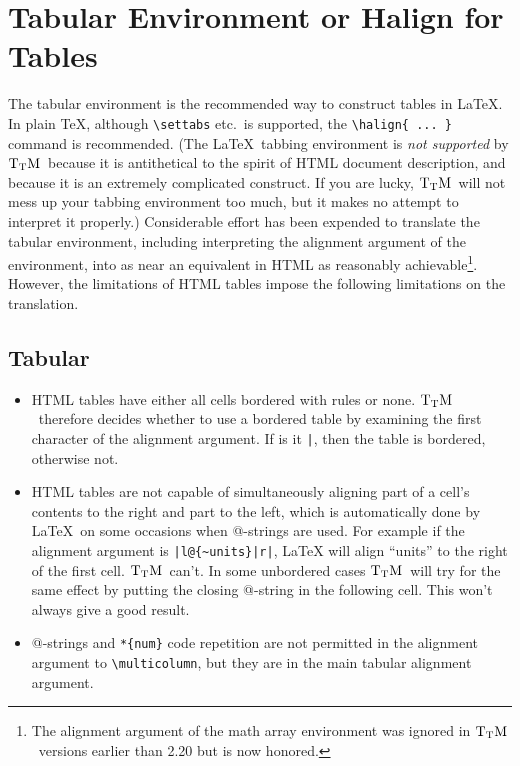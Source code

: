 \documentclass[12pt]{article}
\def\TtM{$\rm{}T_TH$}
\def\TtM{$\rm{}T_TM$}%
\begin{document}
\section{Tabular Environment or Halign for Tables} 
\label{tabhal}
The tabular environment is the recommended way to construct tables in
\LaTeX. In plain \TeX, although \verb|\settabs| etc.~is supported, the
\verb|\halign{ ... }| command is recommended.  (The \LaTeX\ tabbing
environment is \emph{not supported} by \TtM\ because it is antithetical
to the spirit of HTML document description, and because it is an
extremely complicated construct. If you are lucky, \TtM\ will not mess
up your tabbing environment too much, but it makes no attempt to
interpret it properly.) Considerable effort has been expended to
translate the tabular environment, including interpreting the
alignment argument of the environment, into as near an equivalent in
HTML as reasonably achievable\footnote{The alignment argument of the
math array environment was ignored in \TtM\ versions earlier than 2.20
but is now honored.}. However, the limitations of HTML tables impose
the following limitations on the translation.

\subsection{Tabular}
\begin{itemize}

\item HTML tables have either all cells bordered with rules or
none. \TtM\ therefore decides whether to use a bordered table by
examining the first character of the alignment argument. If is it
\verb!|!, then the table is bordered, otherwise not.

\item HTML tables are not capable of simultaneously aligning part of a
cell's contents to the right and part to the left, which is
automatically done by \LaTeX\ on some occasions when @-strings are used.
For example if the alignment argument is \verb!|l@{~units}|r|!, \LaTeX
will align ``units'' to the right of the first cell. \TtM\ can't. In
some unbordered cases \TtM\ will try for the same effect by putting the
closing @-string in the following cell. This won't always give a good
result.

\item @-strings and \verb!*{num}! code repetition are not permitted in the
alignment argument to \verb|\multicolumn|, but they are in the main
tabular alignment argument.
\end{itemize}
\end{document}
